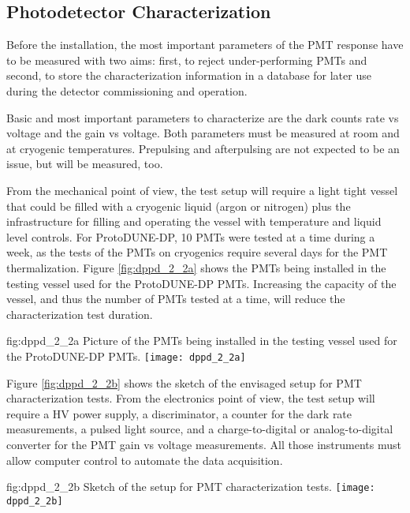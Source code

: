 \subsection{Photodetector Characterization}
\label{sec:fddp-pd-2.2}

Before the installation, the most important parameters of the PMT response have to be measured with two aims: first, to reject under-performing PMTs and second, to store the characterization information in a database for later use during the detector commissioning and operation.

Basic and most important parameters to characterize are the dark counts rate vs voltage and the gain vs voltage. Both parameters must be measured at room and at cryogenic temperatures. Prepulsing and afterpulsing are not expected to be an issue, but will be measured, too. 

From the mechanical point of view, the test setup will require a light tight vessel that could be filled with a cryogenic liquid (argon or nitrogen) plus the infrastructure for filling and operating the vessel with temperature and liquid level controls. For ProtoDUNE-DP, \num{10} PMTs were tested at a time during a week, as the tests of the PMTs on cryogenics require several days for the PMT thermalization. Figure \ref{fig:dppd_2_2a} shows the PMTs being installed in the testing vessel used for the ProtoDUNE-DP PMTs. Increasing the capacity of the vessel, and thus the number of PMTs tested at a time, will reduce the characterization test duration.

\begin{dunefigure}{fig:dppd_2_2a}
{Picture of the PMTs being installed in the testing vessel used for the ProtoDUNE-DP PMTs.}
\texttt{[image: dppd\_2\_2a]}
\end{dunefigure}

Figure \ref{fig:dppd_2_2b} shows the sketch of the envisaged setup for PMT characterization tests. From the electronics point of view, the test setup will require a HV power supply, a discriminator, a counter for the dark rate measurements, a pulsed light source, and a charge-to-digital or analog-to-digital converter for the PMT gain vs voltage measurements. All those instruments must allow computer control to automate the data acquisition.

\begin{dunefigure}{fig:dppd_2_2b}
{Sketch of the setup for PMT characterization tests.}
\texttt{[image: dppd\_2\_2b]}
\end{dunefigure}

